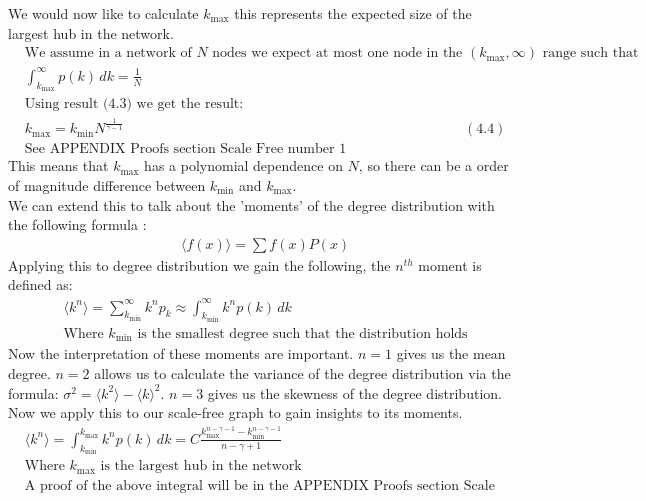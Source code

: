 \documentclass{article}
\begin{document}
        We would now like to calculate $k_{\text{max}}$ this represents the expected size of the largest hub in the network.
        \begin{align*}
            &\text{We assume in a network of $N$ nodes we expect at most one node in the $(k_{\text{max}},\infty)$ range such that}\\
            &\int_{k_{\text{max}}}^{\infty}p(k) \,dk = \frac{1}{N}\\
            &\text{Using result (4.3) we get the result:}\\
            &k_{\text{max}} = k_{\text{min}}N^{\frac{1}{\gamma -1}} &(4.4)\\
            &\text{See APPENDIX Proofs section Scale Free number 1 }
        \end{align*}
        This means that $k_{\text{max}}$ has a polynomial dependence on $N$, so there can be a order of magnitude difference between $k_{\text{min}}$ and $k_{\text{max}}$.\\
        We can extend this to talk about the 'moments' of the degree distribution with the following formula \parencite{papoulis2002probability}:\\
        \begin{align*}
            &\langle f(x) \rangle = \sum f(x)P(x)
        \end{align*}
        Applying this to degree distribution we gain the following, the $n^{th}$ moment is defined as:\\
        \begin{align*}
            &\langle k^n \rangle = \sum_{k_{\text{min}}}^{\infty}k^{n}p_{k} \approx \int_{k_{\text{min}}}^{\infty} k^{n}p(k)  \,dk \\
            &\text{Where $k_{\text{min}}$ is the smallest degree such that the distribution holds}
        \end{align*}
        Now the interpretation of these moments are important. $n=1$ gives us the mean degree. $n=2$ allows us to calculate the variance of the degree distribution via the formula: $\sigma^2 = \langle k^2 \rangle - \langle k\rangle ^2$. $n=3$ gives us the skewness of the degree distribution.
        Now we apply this to our scale-free graph to gain insights to its moments.
        \begin{align*}
            &\langle k^n \rangle = \int_{k_{\text{min}}}^{k_{\text{max}}}k^{n}p(k) \,dk = C\frac{k^{n-\gamma -1}_{\text{max}}-k^{n-\gamma -1}_{\text{min}}}{n-\gamma +1}\\
            &\text{Where $k_{\text{max}}$ is the largest hub in the network }\\
            &\text{A proof of the above integral will be in the APPENDIX Proofs section Scale Free number 2}
        \end{align*}
\end{document}
